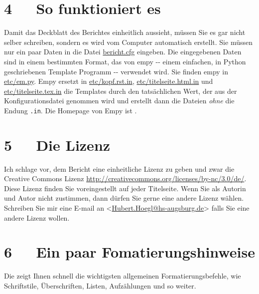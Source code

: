 \documentclass[a4paper,ngerman]{article}
\begin{document}
\section{4~~~So funktioniert es%
  \label{so-funktioniert-es}%
}

Damit das Deckblatt des Berichtes einheitlich aussieht, müssen Sie es gar nicht
selber schreiben, sondern es wird vom Computer automatisch erstellt. Sie müssen
nur ein paar Daten in die Datei \url{bericht.cfg} eingeben.  Die eingegebenen
Daten sind in einem bestimmten Format, das von \textquotedbl{}empy\textquotedbl{} -{}- einem einfachen, in
Python geschriebenen Template Programm -{}- verwendet wird.  Sie finden empy in
\url{etc/em.py}. Empy ersetzt in \url{etc/kopf.rst.in},
\url{etc/titelseite.html.in} und \url{etc/titelseite.tex.in} die Templates durch
den tatsächlichen Wert, der aus der Konfigurationsdatei genommen wird und
erstellt dann die Dateien \emph{ohne} die Endung \texttt{.in}. Die Homepage von Empy
ist \cite{EMPY}.


\section{5~~~Die Lizenz%
  \label{die-lizenz}%
}

Ich schlage vor, dem Bericht eine einheitliche Lizenz zu geben und zwar die
Creative Commons Lizenz \url{http://creativecommons.org/licenses/by-nc/3.0/de/}.
Diese Lizenz finden Sie voreingestellt auf jeder Titelseite. Wenn Sie als
Autorin und Autor nicht zustimmen, dann dürfen Sie gerne eine andere Lizenz
wählen.  Schreiben Sie mir eine E-mail an <\href{mailto:Hubert.Hoegl@hs-augsburg.de}{Hubert.Hoegl@hs-augsburg.de}> falls
Sie eine andere Lizenz wollen.


\section{6~~~Ein paar Fomatierungshinweise%
  \label{ein-paar-fomatierungshinweise}%
}

Die \cite{QUICKREF} zeigt Ihnen schnell die wichtigsten allgemeinen
Formatierungsbefehle, wie Schriftstile, Überschriften, Listen, Aufzählungen und
so weiter.
\end{document}
